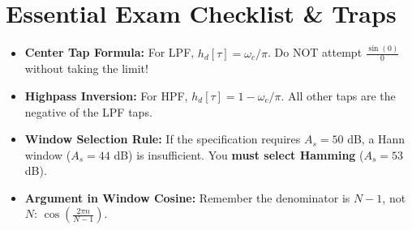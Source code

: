 \documentclass[11pt,a4paper]{article}
\begin{document}
\section{Essential Exam Checklist \& Traps}
\begin{itemize}
    \item[$\square$] \textbf{Center Tap Formula:} For LPF, $h_d[\tau] = \omega_c/\pi$. Do NOT attempt $\frac{\sin(0)}{0}$ without taking the limit!
    \item[$\square$] \textbf{Highpass Inversion:} For HPF, $h_d[\tau] = 1 - \omega_c/\pi$. All other taps are the negative of the LPF taps.
    \item[$\square$] \textbf{Window Selection Rule:} If the specification requires $A_s = 50$ dB, a Hann window ($A_s = 44$ dB) is insufficient. You \textbf{must select Hamming} ($A_s = 53$ dB).
    \item[$\square$] \textbf{Argument in Window Cosine:} Remember the denominator is $N-1$, not $N$: $\cos\left(\frac{2\pi n}{N-1}\right)$.
\end{itemize}
\end{document}
